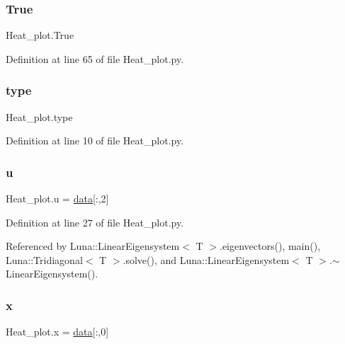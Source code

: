 \mbox{\label{namespaceHeat__plot_a05e302d2a0017c90ec20981f7474cc46}} 
\subsubsection{\texorpdfstring{True}{True}}
{\footnotesize\ttfamily Heat\+\_\+plot.\+True}



Definition at line 65 of file Heat\+\_\+plot.\+py.

\mbox{\label{namespaceHeat__plot_ac6fe7a70a5ebe30ccb91e2255db50868}} 
\subsubsection{\texorpdfstring{type}{type}}
{\footnotesize\ttfamily Heat\+\_\+plot.\+type}



Definition at line 10 of file Heat\+\_\+plot.\+py.

\mbox{\label{namespaceHeat__plot_ae622b86afa46daa3e9b887624ab1bf26}} 
\subsubsection{\texorpdfstring{u}{u}}
{\footnotesize\ttfamily Heat\+\_\+plot.\+u = \hyperlink{namespaceHeat__plot_a5f174ddffb3702db438b5922b832de2d}{data}\mbox{[}\+:,2\mbox{]}}



Definition at line 27 of file Heat\+\_\+plot.\+py.



Referenced by Luna\+::\+Linear\+Eigensystem$<$ T $>$.\+eigenvectors(), main(), Luna\+::\+Tridiagonal$<$ T $>$.\+solve(), and Luna\+::\+Linear\+Eigensystem$<$ T $>$.$\sim$\+Linear\+Eigensystem().

\mbox{\label{namespaceHeat__plot_aa88370c16b85b784ccbde3ed88bc1991}} 
\subsubsection{\texorpdfstring{x}{x}}
{\footnotesize\ttfamily Heat\+\_\+plot.\+x = \hyperlink{namespaceHeat__plot_a5f174ddffb3702db438b5922b832de2d}{data}\mbox{[}\+:,0\mbox{]}}



